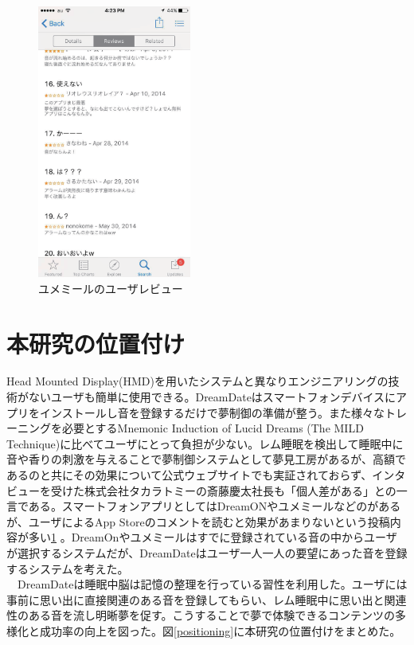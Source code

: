 \begin{figure}[htbp]
 \begin{minipage}{0.45\hsize}
\begin{center}
\includegraphics[height=90mm]{eps/yumemiru.eps}
\caption{ユメミールのユーザレビュー}
\label{DreamOnImage}
\end{center}
\end{minipage}
\end{figure}

\section{本研究の位置付け}
Head Mounted Display(HMD)を用いたシステムと異なりエンジニアリングの技術がないユーザも簡単に使用できる。DreamDateはスマートフォンデバイスにアプリをインストールし音を登録するだけで夢制御の準備が整う。また様々なトレーニングを必要とするMnemonic Induction of Lucid Dreams (The MILD Technique)に比べてユーザにとって負担が少ない。レム睡眠を検出して睡眠中に音や香りの刺激を与えることで夢制御システムとして夢見工房があるが、高額であるのと共にその効果について公式ウェブサイトでも実証されておらず、インタビューを受けた株式会社タカラトミーの斎藤慶太社長も「個人差がある」との一言である\cite{takaratomiComment}。スマートフォンアプリとしてはDreamONやユメミールなどのがあるが、ユーザによるApp Storeのコメントを読むと効果があまりないという投稿内容が多い\ref{DreamOnImage}
。DreamOnやユメミールはすでに登録されている音の中からユーザが選択するシステムだが、DreamDateはユーザ一人一人の要望にあった音を登録するシステムを考えた。\\
　DreamDateは睡眠中脳は記憶の整理を行っている習性を利用した。ユーザには事前に思い出に直接関連のある音を登録してもらい、レム睡眠中に思い出と関連性のある音を流し明晰夢を促す。こうすることで夢で体験できるコンテンツの多様化と成功率の向上を図った。図\ref{positioning}に本研究の位置付けをまとめた。

